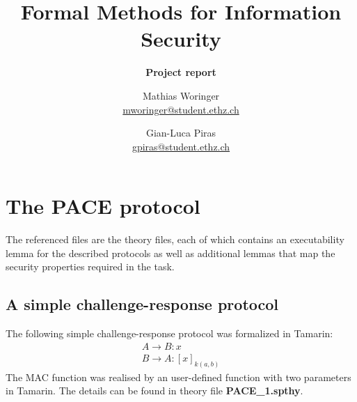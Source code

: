 \documentclass[a4paper,11pt]{scrartcl}
\title{Formal Methods for Information Security}
\author{Mathias Woringer \\ \href{mailto:mworinger@student.ethz.ch} {mworinger@student.ethz.ch}
\and Gian-Luca Piras \\ \href{mailto:gpiras@student.ethz.ch}{gpiras@student.ethz.ch}}
\subtitle{\textbf{Project report}}
\begin{document}
\maketitle

\section{The PACE protocol}
The  referenced files are the theory files, each of which contains an executability lemma for the described protocols as well as additional lemmas that map the security properties required in the task.
\subsection{A simple challenge-response protocol}
The following simple challenge-response protocol was formalized in Tamarin:
\begin{align*}
  A \rightarrow B: x\\
  B \rightarrow A: [x]_{k(a,b)}
\end{align*}
The MAC function was realised by an user-defined function with two parameters in Tamarin.  The details can be found in theory file \textbf{PACE_1.spthy}. 
\end{document}
